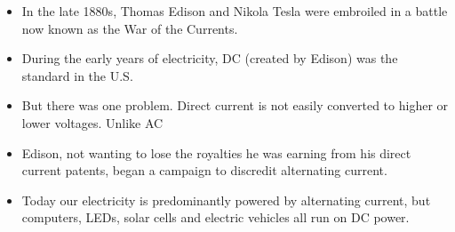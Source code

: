 \documentclass[preview]{standalone}
\begin{document}
\centering \begin{itemize} \item In the late 1880s, Thomas Edison and Nikola Tesla were embroiled in a battle now known as the War of the Currents.\item During the early years of electricity, DC (created by Edison) was the standard in the U.S.\item But there was one problem. Direct current is not easily converted to higher or lower voltages. Unlike AC\item Edison, not wanting to lose the royalties he was earning from his direct current patents, began a campaign to discredit alternating current.\item Today our electricity is predominantly powered by alternating current, but computers, LEDs, solar cells and electric vehicles all run on DC power. \end{itemize}
\end{document}
